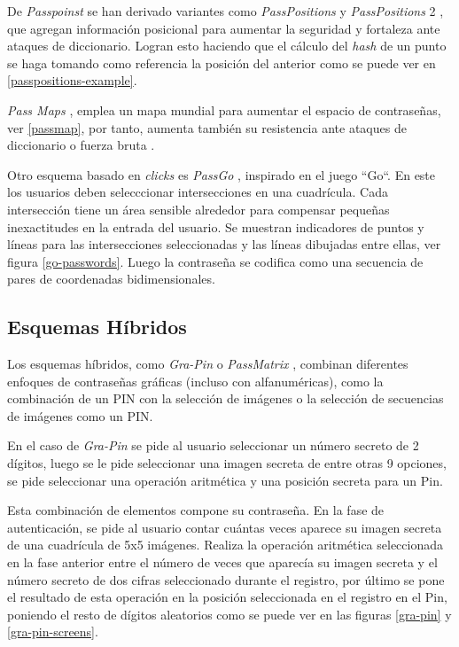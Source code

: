 De \textit{Passpoinst} se han derivado variantes como \textit{PassPositions} y \textit{PassPositions} 2 \cite{8320723}, que agregan información posicional para aumentar la seguridad y fortaleza ante ataques de diccionario. Logran esto haciendo que el cálculo del \textit{hash} de un punto se haga tomando como referencia la posición del anterior como se puede ver en \ref{passpositions-example}.




\textit{Pass Maps} \cite{10.1145/2414456.2414513}, emplea un mapa mundial para aumentar el espacio de contraseñas, ver \ref{passmap}, por tanto, aumenta también su resistencia ante ataques de diccionario o fuerza bruta \cite{5738831}.



Otro esquema basado en \textit{clicks} es \textit{PassGo} \cite{tao2008pass}, inspirado en el juego ``Go``. En este los usuarios deben selecccionar intersecciones en una cuadrícula. Cada intersección tiene un área sensible alrededor para compensar pequeñas inexactitudes en la entrada del usuario. Se muestran indicadores de puntos y líneas para las intersecciones seleccionadas y las líneas dibujadas entre ellas, ver figura \ref{go-passwords}. Luego la contraseña se codifica como una secuencia de pares de coordenadas bidimensionales.



\subsection{Esquemas Híbridos}
Los esquemas híbridos, como \textit{Gra-Pin} \cite{kausar2022gra} o \textit{PassMatrix} \cite{8250568}, combinan diferentes enfoques de contraseñas gráficas (incluso con alfanuméricas), como la combinación de un PIN con la selección de imágenes o la selección de secuencias de imágenes como un PIN. 

En el caso de \textit{Gra-Pin} \cite{kausar2022gra} se pide al usuario seleccionar un número secreto de 2 dígitos, luego se le pide seleccionar una imagen secreta de entre otras 9 opciones, se pide seleccionar una operación aritmética y una posición secreta para  un Pin. 

Esta combinación de elementos compone su contraseña. En la fase de autenticación, se pide al usuario contar cuántas veces aparece su imagen secreta de una cuadrícula de 5x5 imágenes. Realiza la operación aritmética seleccionada en la fase anterior entre el número de veces que aparecía su imagen secreta y el número secreto de dos cifras seleccionado durante el registro, por último se pone el resultado de esta operación en la posición seleccionada en el registro en el Pin, poniendo el resto de dígitos aleatorios como se puede ver en las figuras \ref{gra-pin} y \ref{gra-pin-screens}. 

